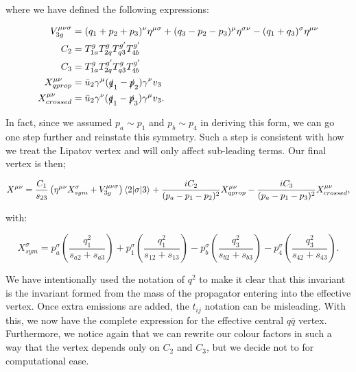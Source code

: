 where we have defined the following expressions: %

\begin{subequations}
\begin{align}
V_{3g}^{\mu \nu \sigma} &= (q_1 + p_2 + p_3)^\nu \eta^{\mu \sigma} + (q_3 - p_2 -p_3)^\mu \eta^{\sigma \nu} - (q_1 + q_3)^\sigma \eta^{\mu \nu} \\
C_2 &= T^g_{1a}T^g_{2q}T^{g'}_{q3}T^{g'}_{4b} \\
C_3 &= T^g_{1a}T^{g'}_{2q}T^g_{q3}T^{g'}_{4b} \\
X_{qprop}^{\mu \nu} &= \bar{u}_2 \gamma^\mu (\slashed{q}_1 - \slashed{p}_2)\gamma^\nu v_3 \\
X_{crossed}^{\mu \nu} &=\bar{u}_2 \gamma^\nu (\slashed{q}_1 - \slashed{p}_3)\gamma^\mu v_3.
\end{align}
\end{subequations}

In fact, since we assumed $p_a \sim p_1$ and $p_b \sim p_4$ in deriving this form, we can go one step further and reinstate this symmetry. Such a step is consistent with how we treat the Lipatov vertex and will only affect sub-leading terms. Our final vertex is then;

\begin{equation}
X^{\mu \nu} = \frac{C_1}{s_{23}} \left(\eta^{\mu \nu} X_{sym}^\sigma + V^{\mu \nu \sigma}_{3g} \right) \mathinner{\langle2\vert\sigma\vert3\rangle}_{} + \frac{i C_2}{(p_a-p_1-p_2)^2} X^{\mu \nu}_{qprop} - \frac{i C_3}{(p_a-p_1-p_3)^2} X^{\mu \nu}_{crossed},
\end{equation}

with:

\begin{equation}
X_{sym}^\sigma = p_a^\sigma \left( \frac{q_1^2}{s_{a2}+s_{a3}} \right) + p_1^\sigma \left( \frac{q_1^2}{s_{12}+s_{13}} \right) 
- p_b^\sigma \left( \frac{q_3^2}{s_{b2}+s_{b3}} \right) - p_4^\sigma \left( \frac{q_3^2}{s_{42}+s_{43}} \right).
\end{equation}

We have intentionally used the notation of $q^2$ to make it clear that this invariant is the invariant formed from the mass of the propagator entering into the effective vertex. Once extra emissions are added, the $t_{ij}$ notation can be misleading. With this, we now have the complete expression for the effective central $q\bar{q}$ vertex. Furthermore, we notice again that we can rewrite our colour factors in such a way that the vertex depends only on $C_2$ and $C_3$, but we decide not to for computational ease. 

